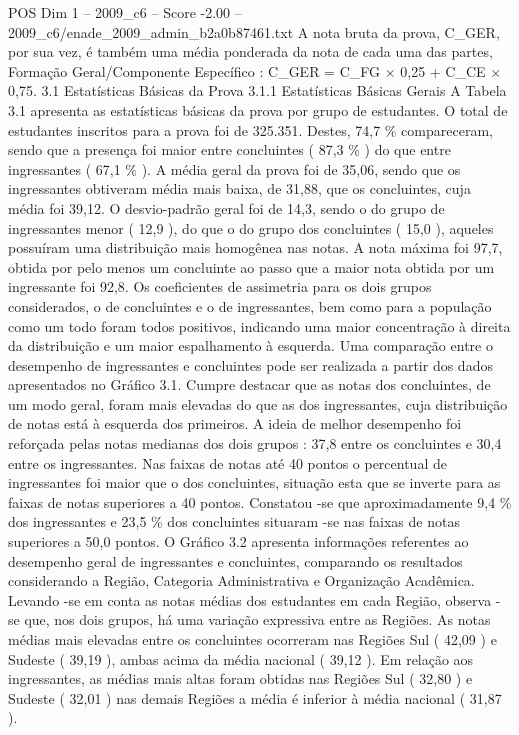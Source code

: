 \begin{textsample}{POS Dim 1 – 2009\_c6 – Score -2.00 – 2009\_c6/enade\_2009\_admin\_b2a0b87461.txt}
A nota bruta da prova, C\_GER, por sua vez, é também uma média ponderada da nota de cada uma das partes, Formação Geral/Componente Específico : C\_GER = C\_FG × 0,25 + C\_CE × 0,75. 3.1 Estatísticas Básicas da Prova 3.1.1 Estatísticas Básicas Gerais A Tabela 3.1 apresenta as estatísticas básicas da prova por grupo de estudantes.
O total de estudantes inscritos para a prova foi de 325.351.
Destes, 74,7 \% compareceram, sendo que a presença foi maior entre concluintes ( 87,3 \% ) do que entre ingressantes ( 67,1 \% ).
A média geral da prova foi de 35,06, sendo que os ingressantes obtiveram média mais baixa, de 31,88, que os concluintes, cuja média foi 39,12.
O desvio-padrão geral foi de 14,3, sendo o do grupo de ingressantes menor ( 12,9 ), do que o do grupo dos concluintes ( 15,0 ), aqueles possuíram uma distribuição mais homogênea nas notas.
A nota máxima foi 97,7, obtida por pelo menos um concluinte ao passo que a maior nota obtida por um ingressante foi 92,8.
Os coeficientes de assimetria para os dois grupos considerados, o de concluintes e o de ingressantes, bem como para a população como um todo foram todos positivos, indicando uma maior concentração à direita da distribuição e um maior espalhamento à esquerda.
Uma comparação entre o desempenho de ingressantes e concluintes pode ser realizada a partir dos dados apresentados no Gráfico 3.1.
Cumpre destacar que as notas dos concluintes, de um modo geral, foram mais elevadas do que as dos ingressantes, cuja distribuição de notas está à esquerda dos primeiros.
A ideia de melhor desempenho foi reforçada pelas notas medianas dos dois grupos : 37,8 entre os concluintes e 30,4 entre os ingressantes.
Nas faixas de notas até 40 pontos o percentual de ingressantes foi maior que o dos concluintes, situação esta que se inverte para as faixas de notas superiores a 40 pontos.
Constatou -se que aproximadamente 9,4 \% dos ingressantes e 23,5 \% dos concluintes situaram -se nas faixas de notas superiores a 50,0 pontos.
O Gráfico 3.2 apresenta informações referentes ao desempenho geral de ingressantes e concluintes, comparando os resultados considerando a Região, Categoria Administrativa e Organização Acadêmica.
Levando -se em conta as notas médias dos estudantes em cada Região, observa -se que, nos dois grupos, há uma variação expressiva entre as Regiões.
As notas médias mais elevadas entre os concluintes ocorreram nas Regiões Sul ( 42,09 ) e Sudeste ( 39,19 ), ambas acima da média nacional ( 39,12 ).
Em relação aos ingressantes, as médias mais altas foram obtidas nas Regiões Sul ( 32,80 ) e Sudeste ( 32,01 ) nas demais Regiões a média é inferior à média nacional ( 31,87 ).

\end{textsample}
